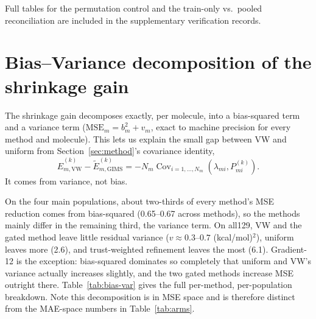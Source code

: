 \documentclass{article}
\begin{document}
Full tables for the permutation control and the train-only vs.\ pooled
reconciliation are included in the supplementary verification records.

\section{Bias--Variance decomposition of the shrinkage gain}
\label{app:bias-var}

The shrinkage gain decomposes exactly, per molecule, into a bias-squared
term and a variance term ($\mathrm{MSE}_m = b_m^2 + v_m$, exact to machine
precision for every method and molecule). This lets us explain the small gap
between VW and uniform from Section~\ref{sec:method}'s covariance identity,
\[
\hat{E}_{m,\mathrm{VW}}^{(k)} - \widetilde{E}_{m,\mathrm{GIMS}}^{(k)}
= -N_m \operatorname{Cov}_{i=1,\dots,N_m}(\lambda_{mi},P_{mi}^{(k)}) .
\]It comes from
variance, not bias.

On the four main populations, about two-thirds of every method's MSE reduction
comes from bias-squared (0.65--0.67 across methods), so the methods mainly differ
in the remaining third, the variance term. On all129, VW and the gated method
leave little residual variance ($v\approx0.3$--$0.7$ (kcal/mol)$^2$),
uniform leaves more (2.6), and trust-weighted refinement leaves the most
(6.1). Gradient-12 is the exception: bias-squared dominates so completely
that uniform and VW's variance actually increases slightly, and the two
gated methods increase MSE outright there. Table~\ref{tab:bias-var} gives the
full per-method, per-population breakdown. Note this decomposition is in MSE
space and is therefore distinct from the MAE-space numbers in
Table~\ref{tab:arms}.
\end{document}
